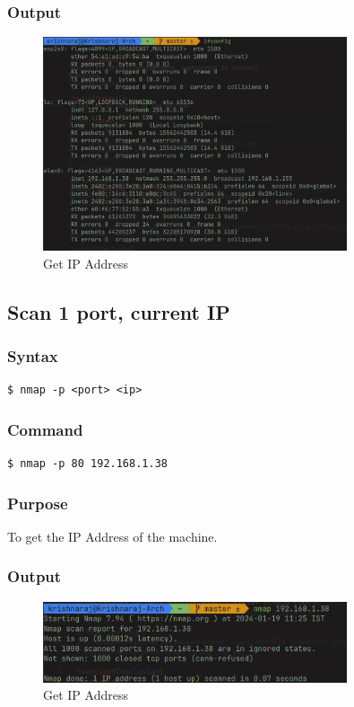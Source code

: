\documentclass[11pt]{article}
\begin{document}
\subsubsection*{Output}
\begin{figure}[H]
    \centering
    \includegraphics[width=0.8\textwidth]{ifconfig.png}
    \caption{Get IP Address}
    \label{fig:1}
\end{figure}

\subsection{Scan 1 port, current IP}

\subsubsection{Syntax}
\begin{verbatim}
$ nmap -p <port> <ip>
\end{verbatim}

\subsubsection*{Command}
\begin{verbatim}
$ nmap -p 80 192.168.1.38
\end{verbatim}

\subsubsection*{Purpose}
To get the IP Address of the machine.

\subsubsection*{Output}
\begin{figure}[H]
    \centering
    \includegraphics[width=0.8\textwidth]{nmap ip.png}
    \caption{Get IP Address}
    \label{fig:1}
\end{figure}
\end{document}
